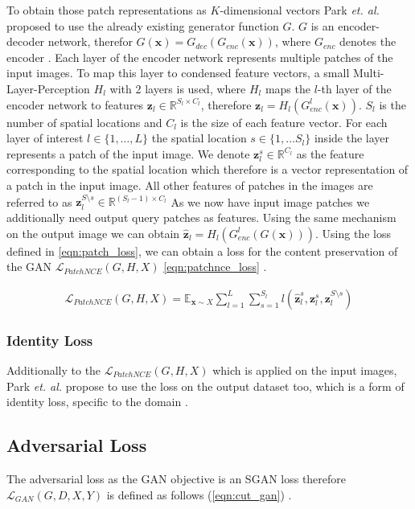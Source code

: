 \documentclass[a4paper,11pt, DIV=12]{scrartcl}
\newcommand{\x}{\boldsymbol{x}}
\begin{document}
To obtain those patch representations as $K$-dimensional vectors Park \textit{et. al.} proposed to use the already existing
generator function $G$. $G$ is an encoder-decoder network, therefor $G(\x) = G_{dec}(G_{enc}(\x))$, where $G_{enc}$ denotes the encoder \cite{cut}.
Each layer of the encoder network represents multiple patches of the input images. To map this layer to condensed feature vectors,
a small Multi-Layer-Perception $H_l$ with 2 layers is used, where $H_l$ maps the $l$-th layer of the encoder network to features
$\boldsymbol{z}_l \in \mathbb{R}^{S_l \times C_l}$, therefore $\boldsymbol{z}_l = H_l(G_{enc}^l(\x))$.
$S_l$ is the number of spatial locations and $C_l$ is the size of each feature vector.
For each layer of interest $l \in \{1, \dots, L\}$ the spatial location $s \in \{1, \dots S_l\}$ inside the layer represents a patch of the input image.
We denote $\boldsymbol{z}_l^s \in \mathbb{R}^{C_l}$ as the feature corresponding to the spatial location which therefore is a vector representation of a patch
in the input image. All other features of patches in the images are referred to as $\boldsymbol{z}_l^{S \setminus s} \in \mathbb{R}^{(S_l - 1) \times C_l}$
As we now have input image patches we additionally need output query patches as features. Using the same mechanism on the output image we can obtain
$\boldsymbol{\hat{z}}_l = H_l(G_{enc}^l(G(\x)))$. Using the loss defined in \autoref{eqn:patch_loss}, we can obtain a loss for the content preservation of the
GAN $\mathcal{L}_{PatchNCE}(G,H,X)$ \autoref{eqn:patchnce_loss} \cite{cut}.

\begin{equation}
   \label{eqn:patchnce_loss}
   \begin{aligned}
      \mathcal{L}_{PatchNCE}(G,H,X) = \mathbb{E}_{\x \sim X} \sum_{l = 1}^L \sum_{s=1}^{S_l} l(\boldsymbol{\hat{z}}_l^s, \boldsymbol{z}_l^s, \boldsymbol{z}_l^{S \setminus s})
   \end{aligned}
\end{equation}

\subsubsection*{Identity Loss}
Additionally to the $\mathcal{L}_{PatchNCE}(G, H, X)$ which is applied on the input images, Park \textit{et. al.} propose to use the loss on the output dataset too,
which is a form of identity loss, specific to the domain \cite{cut}.

\subsection*{Adversarial Loss}
The adversarial loss as the GAN objective is an SGAN loss therefore $\mathcal{L}_{GAN}(G, D, X, Y)$ is defined
as follows (\autoref{eqn:cut_gan}) \cite{cut}.
\end{document}
